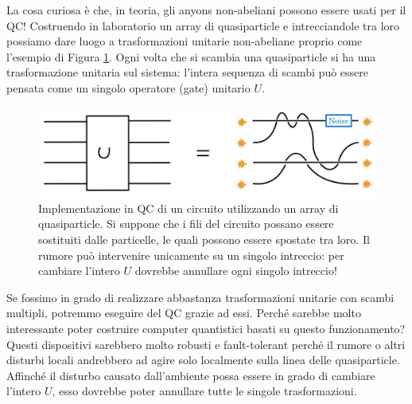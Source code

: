 \noindent La cosa curiosa è che, in teoria, gli anyons non-abeliani possono essere usati per il QC! Costruendo in laboratorio un array di quasiparticle e intrecciandole tra loro possiamo dare luogo a trasformazioni unitarie non-abeliane proprio come l'esempio di Figura \ref{fig:tqc}. Ogni volta che si scambia una quasiparticle si ha una trasformazione unitaria sul sistema: l'intera sequenza di scambi può essere pensata come un singolo operatore (gate) unitario $U$.

\begin{figure}[!t]
    \centering
    \includegraphics[scale=0.4]{images/tqc.jpeg}
    \caption{Implementazione in QC di un circuito utilizzando un array di quasiparticle. Si suppone che i fili del circuito possano essere sostituiti dalle particelle, le quali possono essere spostate tra loro. Il rumore può intervenire unicamente su un singolo intreccio: per cambiare l'intero $U$ dovrebbe annullare ogni singolo intreccio!}
    \label{fig:tqc}
\end{figure}

\noindent Se fossimo in grado di realizzare abbastanza trasformazioni unitarie con scambi multipli, potremmo eseguire del QC grazie ad essi. Perché sarebbe molto interessante poter costruire computer quantistici basati su questo funzionamento? Questi dispositivi sarebbero molto robusti e fault-tolerant perché il rumore o altri disturbi locali andrebbero ad agire solo localmente sulla linea delle quasiparticle. Affinché il disturbo causato dall'ambiente possa essere in grado di cambiare l'intero $U$, esso dovrebbe poter annullare tutte le singole trasformazioni.

